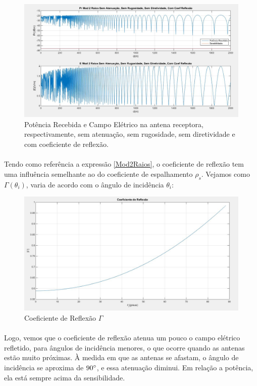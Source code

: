 \FloatBarrier
\begin{figure}[!htp]
\centering
\includegraphics[scale = 0.3]{Figuras/SA_SR_SD_CCR.JPG}
\caption{Potência Recebida e Campo Elétrico na antena receptora, respectivamente, sem atenuação, sem rugosidade, sem diretividade e com coeficiente de reflexão.}
\end{figure}
\FloatBarrier

\paragraph{}Tendo como referência a expressão \ref{Mod2Raios}, o coeficiente de reflexão tem uma influência semelhante ao do coeficiente de espalhamento $\rho_s$. Vejamos como $\Gamma(\theta_i)$, varia de acordo com o ângulo de incidência $\theta_i$:

\FloatBarrier
\begin{figure}[!htp]
\centering
\includegraphics[scale = 0.3]{Figuras/Coef_Ref.JPG}
\caption{Coeficiente de Reflexão $\Gamma$}
\end{figure}
\FloatBarrier

\paragraph{}Logo, vemos que o coeficiente de reflexão atenua um pouco o campo elétrico refletido, para ângulos de incidência menores, o que ocorre quando as antenas estão muito próximas. À medida em que as antenas se afastam, o ângulo de incidência se aproxima de $90\degree$, e essa atenuação diminui. Em relação a potência, ela está sempre acima da sensibilidade.

